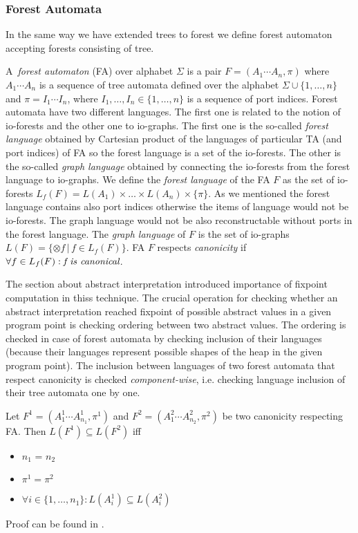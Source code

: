 \documentclass[a4paper, 12pt]{article}
\begin{document}
\subsubsection{Forest Automata}
\label{subsec:fa}

In the same way we have extended trees to forest we define forest automaton
accepting forests consisting of tree.

A~\emph{forest automaton} (FA) over alphabet $\Sigma$ is a pair $F=(A_1\cdots A_n, \pi)$
where $A_1 \cdots A_n$ is a sequence of tree automata defined over the alphabet $\Sigma \cup \{1,\ldots,n\}$
and $\pi = I_1 \cdots I_n$, where $I_1,\ldots, I_n \in \{1, \ldots, n\}$ is a sequence of port indices.
Forest automata have two different languages.
The first one is related to the notion of io-forests and the other one to io-graphs.
The first one is the so-called \emph{forest language} obtained by Cartesian product of the languages of particular TA (and port indices) of FA
so the forest language is a set of the io-forests.
The other is the so-called \emph{graph language} obtained by connecting the io-forests from the forest language to io-graphs.
We define the \emph{forest language} of the FA $F$ as the set of io-forests $L_f(F)= L(A_1) \times \ldots \times L(A_n) \times \{\pi\}$.
As we mentioned the forest language contains also port indices otherwise the items of language would not be io-forests.
The graph language would not be also reconstructable without ports in the forest language.
The \emph{graph language} of $F$ is the set of io-graphs $L(F) = \{\otimes f\,|\, f \in L_f(F)\}$.
FA $F$ respects \emph{canonicity} if $\forall f \in L_f(F): \emph{f is canonical}$.

The section about abstract interpretation introduced importance of fixpoint
computation in thiss technique.
The crucial operation for checking whether an abstract interpretation
reached fixpoint of possible abstract values in a given program point is
checking ordering between two abstract values.
The ordering is checked in case of forest automata by checking
inclusion of their languages (because their languages represent
possible shapes of the heap in the given program point).
The inclusion between languages of two forest automata that respect canonicity 
is checked \emph{component-wise},
i.e. checking language inclusion of their tree automata one by one.

\begin{lemma}
	Let $F^1 = (A_1^1\cdots A_{n_{1}}^1, \pi^1)$ and $F^2 = (A_1^2\cdots A_{n_{2}}^2, \pi^2)$
	be two canonicity respecting FA.
	Then $L(F^1) \subseteq L(F^2)$ iff
	\begin{itemize}
			\item $n_1$ = $n_2$
			\item $\pi^1 = \pi^2$
			\item $\forall i \in \{1,\ldots,n_1\}: L(A_i^1) \subseteq L(A_i^2)$
	\end{itemize}
\end{lemma}
Proof can be found in \cite{forester:techrep}.
\end{document}
